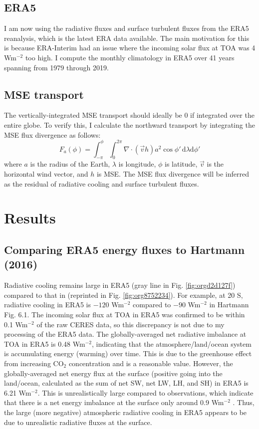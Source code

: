 \documentclass[11pt]{article}
\begin{document}
\subsection{ERA5}
\label{sec:orgdb3cdf1}
I am now using the radiative fluxes and surface turbulent fluxes from the ERA5 reanalysis, which is the latest ERA data available. The main motivation for this is because ERA-Interim had an issue where the incoming solar flux at TOA was 4 Wm\(^{-2}\) too high. I compute the monthly climatology in ERA5 over 41 years spanning from 1979 through 2019.

\subsection{MSE transport}
\label{sec:orgafb3a6e}
The vertically-integrated MSE transport should ideally be 0 if integrated over the entire globe. To verify this, I calculate the northward transport by integrating the MSE flux divergence as follows:
\begin{equation}
F_a(\phi) = \int_{-\pi}^{\phi}\int_{0}^{2\pi} \!\nabla\cdot(\vec{v}h)a^2\cos{\phi'} \, \mathrm{d}\lambda \mathrm{d}\phi'
\end{equation}
where \(a\) is the radius of the Earth, \(\lambda\) is longitude, \(\phi\) is latitude, \(\vec{v}\) is the horizontal wind vector, and \(h\) is MSE. The MSE flux divergence will be inferred as the residual of radiative cooling and surface turbulent fluxes.

\section{Results}
\label{sec:orgc0c41cd}
\subsection{Comparing ERA5 energy fluxes to Hartmann (2016)}
\label{sec:org066fc93}
Radiative cooling remains large in ERA5 (gray line in Fig. \ref{fig:orgd2d127f}) compared to that in \cite{hartmann_global_2016} (reprinted in Fig. \ref{fig:org8752234}). For example, at 20 S, radiative cooling in ERA5 is \(-120\) Wm\(^{-2}\) compared to \(-90\) Wm\(^{-2}\) in Hartmann Fig. 6.1. The incoming solar flux at TOA in ERA5 was confirmed to be within 0.1 Wm\(^{-2}\) of the raw CERES data, so this discrepancy is not due to my processing of the ERA5 data. The globally-averaged net radiative imbalance at TOA in ERA5 is 0.48 Wm\(^{-2}\), indicating that the atmosphere/land/ocean system is accumulating energy (warming) over time. This is due to the greenhouse effect from increasing CO\(_2\) concentration and is a reasonable value. However, the globally-averaged net energy flux at the surface (positive going into the land/ocean, calculated as the sum of net SW, net LW, LH, and SH) in ERA5 is 6.21 Wm\(^{-2}\). This is unrealistically large compared to observations, which indicate that there is a net energy imbalance at the surface only around 0.9 Wm\(^{-2}\) \cite{trenberth_earths_2009}. Thus, the large (more negative) atmospheric radiative cooling in ERA5 appears to be due to unrealistic radiative fluxes at the surface.
\end{document}
